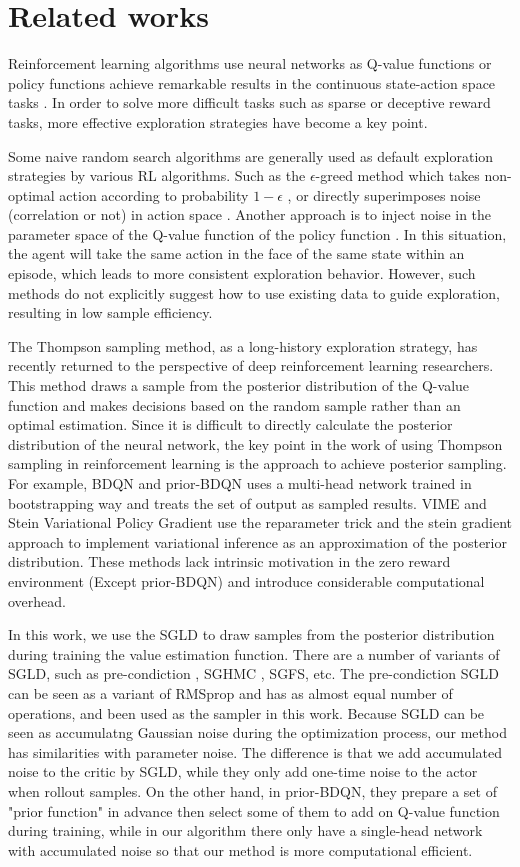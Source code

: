 \section{Related works}
Reinforcement learning algorithms use neural networks as Q-value functions or policy functions achieve remarkable results in the continuous state-action space tasks . In order to solve more difficult tasks such as sparse or deceptive reward tasks, more effective exploration strategies have become a key point.

Some naive random search algorithms are generally used as default exploration strategies by various RL algorithms. Such as the $\epsilon$-greed method which takes non-optimal action according to probability $1-\epsilon$ \cite{DQN}, or directly superimposes noise (correlation or not) in action space \cite{DDPG}. Another approach is to inject noise in the parameter space of the Q-value function of the policy function \cite{pnoise}. In this situation, the agent will take the same action in the face of the same state within an episode, which leads to more consistent exploration behavior. However, such methods do not explicitly suggest how to use existing data to guide exploration, resulting in low sample efficiency. 

The Thompson sampling method, as a long-history exploration strategy, has recently returned to the perspective of deep reinforcement learning researchers. This method draws a sample from the posterior distribution of the Q-value function and makes decisions based on the random sample rather than an optimal estimation. Since it is difficult to directly calculate the posterior distribution of the neural network, the key point in the work of using Thompson sampling in reinforcement learning is the approach to achieve posterior sampling. For example, BDQN \cite{BDQN} and prior-BDQN \cite{osband2018randomized} uses a multi-head network trained in bootstrapping way and treats the set of output as sampled results. VIME \cite{VIME} and Stein Variational Policy Gradient \cite{liu2017stein} use the reparameter trick and the stein gradient approach to implement variational inference as an approximation of the posterior distribution. These methods lack intrinsic motivation in the zero reward environment (Except prior-BDQN) and introduce considerable computational overhead. 

In this work, we use the SGLD to draw samples from the posterior distribution during training the value estimation function. There are a number of variants of SGLD, such as pre-condiction \cite{pSGLD}, SGHMC \cite{SGHMC}, SGFS\cite{SGFS}, etc. The pre-condiction SGLD can be seen as a variant of RMSprop and has as almost equal number of operations, and been used as the sampler in this work. Because SGLD can be seen as accumulatng Gaussian noise during the optimization process, our method has similarities with parameter noise. The difference is that we add accumulated noise to the critic by SGLD, while they only add one-time noise to the actor when rollout samples. On the other hand, in prior-BDQN, they prepare a set of "prior function" in advance then select some of them to add on Q-value function during training, while in our algorithm there only have a single-head network with accumulated noise so that our method is more computational efficient.
